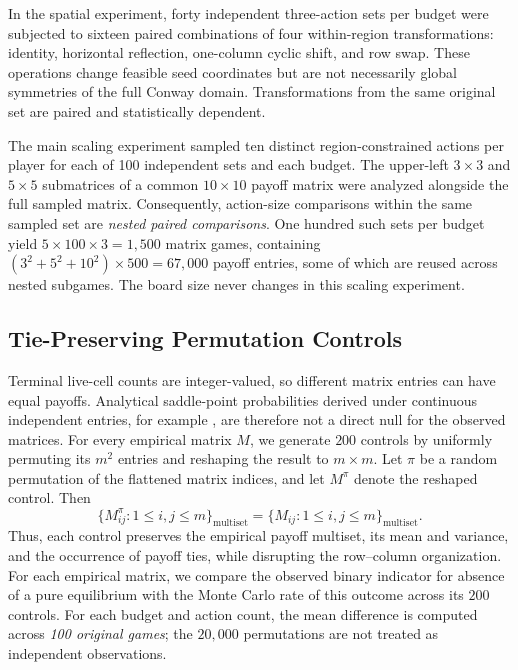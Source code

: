 \documentclass[games,article,submit,moreauthors]{Definitions/mdpi}
\begin{document}
In the spatial experiment, forty independent three-action sets per budget were subjected to sixteen paired combinations of four within-region transformations: identity, horizontal reflection, one-column cyclic shift, and row swap. These operations change feasible seed coordinates but are not necessarily global symmetries of the full Conway domain. Transformations from the same original set are paired and statistically dependent.

The main scaling experiment sampled ten distinct region-constrained actions per player for each of 100 independent sets and each budget. The upper-left $3\times3$ and $5\times5$ submatrices of a common $10\times10$ payoff matrix were analyzed alongside the full sampled matrix. Consequently, action-size comparisons within the same sampled set are \emph{nested paired comparisons}. One hundred such sets per budget yield $5\times100\times3=1{,}500$ matrix games, containing $(3^2+5^2+10^2)\times500=67{,}000$ payoff entries, some of which are reused across nested subgames. The board size never changes in this scaling experiment.

\subsection{Tie-Preserving Permutation Controls}\label{sec:permutation_method}

Terminal live-cell counts are integer-valued, so different matrix entries can have equal payoffs. Analytical saddle-point probabilities derived under continuous independent entries, for example \citet{thorp1979}, are therefore not a direct null for the observed matrices. For every empirical matrix $M$, we generate $200$ controls by uniformly permuting its $m^2$ entries and reshaping the result to $m\times m$. Let $\pi$ be a random permutation of the flattened matrix indices, and let $M^{\pi}$ denote the reshaped control. Then
\begin{equation}
\{M^{\pi}_{ij}:1\le i,j\le m\}_{\mathrm{multiset}}
=
\{M_{ij}:1\le i,j\le m\}_{\mathrm{multiset}}.
\end{equation}
Thus, each control preserves the empirical payoff multiset, its mean and variance, and the occurrence of payoff ties, while disrupting the row--column organization. For each empirical matrix, we compare the observed binary indicator for absence of a pure equilibrium with the Monte Carlo rate of this outcome across its $200$ controls. For each budget and action count, the mean difference is computed across \emph{100 original games}; the $20{,}000$ permutations are not treated as independent observations.
\end{document}
